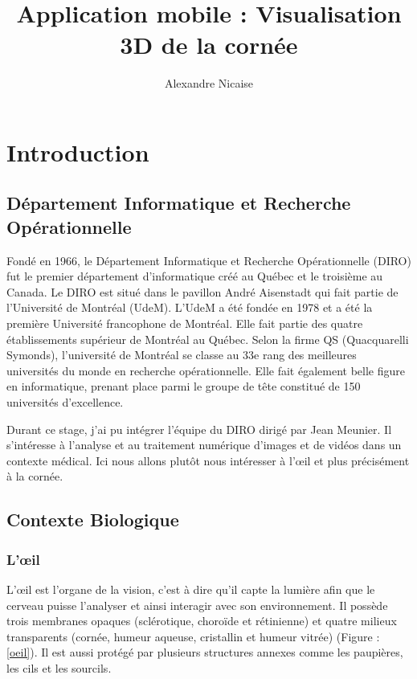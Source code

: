 \documentclass[a4paper,12pt]{article}
\author{Alexandre Nicaise}
\title{Application mobile : Visualisation 3D de la cornée}
\begin{document}
\maketitle

\newpage
\tableofcontents
\newpage


\section{Introduction}
	\subsection{Département Informatique et Recherche Opérationnelle}
Fondé en 1966, le Département Informatique et Recherche Opérationnelle (DIRO) fut le premier département d’informatique créé au Québec et le troisième au Canada. Le DIRO est situé dans le pavillon André Aisenstadt qui fait partie de l'Université de Montréal (UdeM). L'UdeM a été fondée en 1978 et a été la première Université francophone de Montréal. Elle fait partie des quatre établissements supérieur de Montréal au Québec. Selon la firme QS (Quacquarelli Symonds), l'université de Montréal se classe au 33e rang des meilleures universités du monde en recherche opérationnelle. Elle fait également belle figure en informatique, prenant place parmi le groupe de tête constitué de 150 universités d'excellence. 
		
Durant ce stage, j'ai pu intégrer l'équipe du DIRO dirigé par Jean Meunier. Il s'intéresse à l'analyse et au traitement numérique d’images et de vidéos dans un contexte médical. Ici nous allons plutôt nous intéresser à l'œil et plus précisément à la cornée.

	\subsection{Contexte Biologique}
		\subsubsection{L'œil}
		
L'œil est l'organe de la vision, c'est à dire qu'il capte la lumière afin que le cerveau puisse l'analyser et ainsi interagir avec son environnement. Il possède trois membranes opaques (sclérotique, choroïde et rétinienne) et quatre milieux transparents (cornée, humeur aqueuse, cristallin et humeur vitrée) (Figure : \ref{oeil}). Il est aussi protégé par plusieurs structures annexes comme les paupières, les cils et les sourcils.
\end{document}
